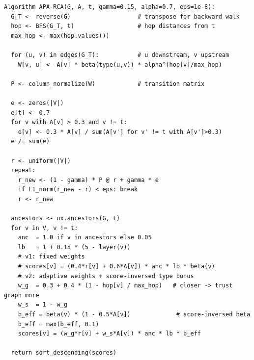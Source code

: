 \documentclass{article}
\begin{document}
\begin{verbatim}
Algorithm APA-RCA(G, A, t, gamma=0.15, alpha=0.7, eps=1e-8):
  G_T <- reverse(G)                   # transpose for backward walk
  hop <- BFS(G_T, t)                  # hop distances from t
  max_hop <- max(hop.values())

  for (u, v) in edges(G_T):           # u downstream, v upstream
    W[v, u] <- A[v] * beta(type(u,v)) * alpha^(hop[v]/max_hop)

  P <- column_normalize(W)            # transition matrix

  e <- zeros(|V|)
  e[t] <- 0.7
  for v with A[v] > 0.3 and v != t:
    e[v] <- 0.3 * A[v] / sum(A[v'] for v' != t with A[v']>0.3)
  e /= sum(e)

  r <- uniform(|V|)
  repeat:
    r_new <- (1 - gamma) * P @ r + gamma * e
    if L1_norm(r_new - r) < eps: break
    r <- r_new

  ancestors <- nx.ancestors(G, t)
  for v in V, v != t:
    anc  = 1.0 if v in ancestors else 0.05
    lb   = 1 + 0.15 * (5 - layer(v))
    # v1: fixed weights
    # scores[v] = (0.4*r[v] + 0.6*A[v]) * anc * lb * beta(v)
    # v2: adaptive weights + score-inversed type bonus
    w_g  = 0.3 + 0.4 * (1 - hop[v] / max_hop)   # closer -> trust graph more
    w_s  = 1 - w_g
    b_eff = beta(v) * (1 - 0.5*A[v])             # score-inversed beta
    b_eff = max(b_eff, 0.1)
    scores[v] = (w_g*r[v] + w_s*A[v]) * anc * lb * b_eff

  return sort_descending(scores)
\end{verbatim}
\end{document}
